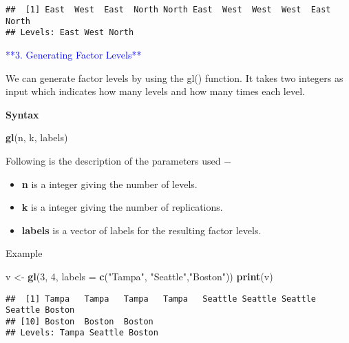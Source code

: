 \documentclass[
]{article}
\newenvironment{Shaded}{\begin{snugshade}}{\end{snugshade}}
\newcommand{\AttributeTok}[1]{\textcolor[rgb]{0.13,0.29,0.53}{#1}}
\newcommand{\DecValTok}[1]{\textcolor[rgb]{0.00,0.00,0.81}{#1}}
\newcommand{\FunctionTok}[1]{\textcolor[rgb]{0.13,0.29,0.53}{\textbf{#1}}}
\newcommand{\NormalTok}[1]{#1}
\newcommand{\OtherTok}[1]{\textcolor[rgb]{0.56,0.35,0.01}{#1}}
\newcommand{\StringTok}[1]{\textcolor[rgb]{0.31,0.60,0.02}{#1}}
\providecommand{\tightlist}{%
  \setlength{\itemsep}{0pt}\setlength{\parskip}{0pt}}
\begin{document}
\begin{verbatim}
##  [1] East  West  East  North North East  West  West  West  East  North
## Levels: East West North
\end{verbatim}

\textcolor{blue}{**3. Generating Factor Levels**}

We can generate factor levels by using the gl() function. It takes two
integers as input which indicates how many levels and how many times
each level.

\textbf{Syntax}

\begin{Shaded}
\begin{Highlighting}[]
\FunctionTok{gl}\NormalTok{(n, k, labels)}
\end{Highlighting}
\end{Shaded}

Following is the description of the parameters used −

\begin{itemize}
\tightlist
\item
  \textbf{n} is a integer giving the number of levels.
\item
  \textbf{k} is a integer giving the number of replications.
\item
  \textbf{labels} is a vector of labels for the resulting factor levels.
\end{itemize}

Example

\begin{Shaded}
\begin{Highlighting}[]
\NormalTok{v }\OtherTok{\textless{}{-}} \FunctionTok{gl}\NormalTok{(}\DecValTok{3}\NormalTok{, }\DecValTok{4}\NormalTok{, }\AttributeTok{labels =} \FunctionTok{c}\NormalTok{(}\StringTok{"Tampa"}\NormalTok{, }\StringTok{"Seattle"}\NormalTok{,}\StringTok{"Boston"}\NormalTok{))}
\FunctionTok{print}\NormalTok{(v)}
\end{Highlighting}
\end{Shaded}

\begin{verbatim}
##  [1] Tampa   Tampa   Tampa   Tampa   Seattle Seattle Seattle Seattle Boston 
## [10] Boston  Boston  Boston 
## Levels: Tampa Seattle Boston
\end{verbatim}
\end{document}
